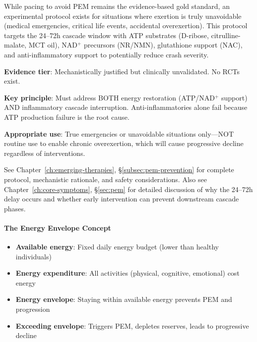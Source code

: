 \begin{keypoint}
While pacing to avoid PEM remains the evidence-based gold standard, an experimental protocol exists for situations where exertion is truly unavoidable (medical emergencies, critical life events, accidental overexertion). This protocol targets the 24--72h cascade window with ATP substrates (D-ribose, citrulline-malate, MCT oil), NAD$^+$ precursors (NR/NMN), glutathione support (NAC), and anti-inflammatory support to potentially reduce crash severity.

\textbf{Evidence tier}: Mechanistically justified but clinically unvalidated. No RCTs exist.

\textbf{Key principle}: Must address BOTH energy restoration (ATP/NAD$^+$ support) AND inflammatory cascade interruption. Anti-inflammatories alone fail because ATP production failure is the root cause.

\textbf{Appropriate use}: True emergencies or unavoidable situations only—NOT routine use to enable chronic overexertion, which will cause progressive decline regardless of interventions.

See Chapter~\ref{ch:emerging-therapies}, \S\ref{subsec:pem-prevention} for complete protocol, mechanistic rationale, and safety considerations. Also see Chapter~\ref{ch:core-symptoms}, \S\ref{sec:pem} for detailed discussion of why the 24--72h delay occurs and whether early intervention can prevent downstream cascade phases.
\end{keypoint}

\paragraph{The Energy Envelope Concept}

\begin{itemize}
    \item \textbf{Available energy}: Fixed daily energy budget (lower than healthy individuals)
    \item \textbf{Energy expenditure}: All activities (physical, cognitive, emotional) cost energy
    \item \textbf{Energy envelope}: Staying within available energy prevents PEM and progression
    \item \textbf{Exceeding envelope}: Triggers PEM, depletes reserves, leads to progressive decline
\end{itemize}

